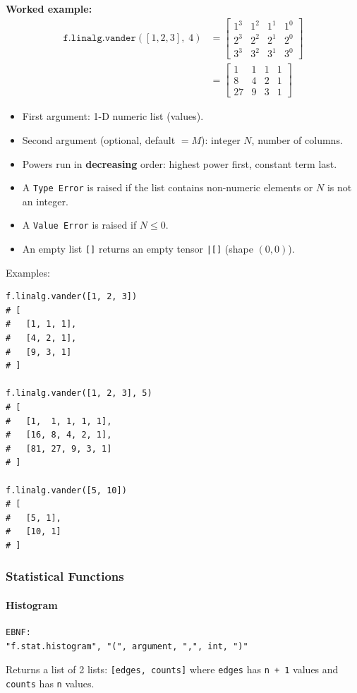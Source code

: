 \textbf{Worked example:}
\begin{align*}
\texttt{f.linalg.vander}([1, 2, 3],\; 4) &=
\begin{bmatrix}
1^3 & 1^2 & 1^1 & 1^0 \\
2^3 & 2^2 & 2^1 & 2^0 \\
3^3 & 3^2 & 3^1 & 3^0
\end{bmatrix} \\
&= \begin{bmatrix}
1  & 1 & 1 & 1 \\
8  & 4 & 2 & 1 \\
27 & 9 & 3 & 1
\end{bmatrix}
\end{align*}

\begin{itemize}
\item First argument: 1-D numeric list (values).
\item Second argument (optional, default $= M$): integer $N$, number of columns.
\item Powers run in \textbf{decreasing} order: highest power first, constant term last.
\item A \texttt{Type Error} is raised if the list contains non-numeric elements or $N$ is not an integer.
\item A \texttt{Value Error} is raised if $N \leq 0$.
\item An empty list \texttt{[]} returns an empty tensor \texttt{|[]} (shape $(0, 0)$).
\end{itemize}
Examples:
\begin{verbatim}
f.linalg.vander([1, 2, 3])
# [
#   [1, 1, 1],
#   [4, 2, 1],
#   [9, 3, 1]
# ]

f.linalg.vander([1, 2, 3], 5)
# [
#   [1,  1, 1, 1, 1],
#   [16, 8, 4, 2, 1],
#   [81, 27, 9, 3, 1]
# ]

f.linalg.vander([5, 10])
# [
#   [5, 1],
#   [10, 1]
# ]
\end{verbatim}

\subsubsection{Statistical Functions}
\paragraph{Histogram}
\begin{verbatim}
EBNF:
"f.stat.histogram", "(", argument, ",", int, ")"
\end{verbatim}
Returns a list of 2 lists: \texttt{[edges, counts]} where \texttt{edges} has \texttt{n + 1} values and \texttt{counts} has \texttt{n} values.

